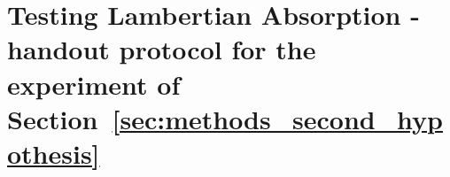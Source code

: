 \chapter{Testing Lambertian Absorption - handout protocol for the
experiment of Section~\ref{sec:methods_second_hypothesis}}
\label{ap:protocol}


